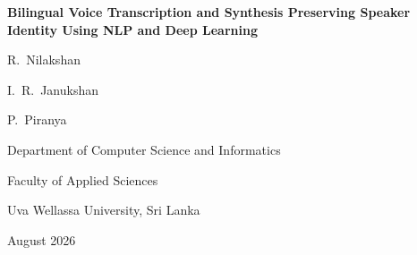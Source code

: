 \documentclass[12pt,a4paper,oneside]{report}
\newcommand{\thesistitle}{Bilingual Voice Transcription and Synthesis Preserving
Speaker Identity Using NLP and Deep Learning}
\newcommand{\submissionmonth}{August 2026}
\begin{document}
\thispagestyle{empty}
\begin{center}
  \singlespacing\setlength{\parskip}{0pt}
  \vspace*{2.0cm}

  {\LARGE\bfseries \thesistitle\par}

  \vspace{3.0cm}

  {\large R.\ Nilakshan\par}
  {\large I.\ R.\ Janukshan\par}
  {\large P.\ Piranya\par}

  \vspace{3.0cm}

  {\large Department of Computer Science and Informatics\par}
  {\large Faculty of Applied Sciences\par}
  {\large Uva Wellassa University, Sri Lanka\par}

  \vspace{2.0cm}

  {\large \submissionmonth\par}
\end{center}
\clearpage

\frontmatterpages
\end{document}
